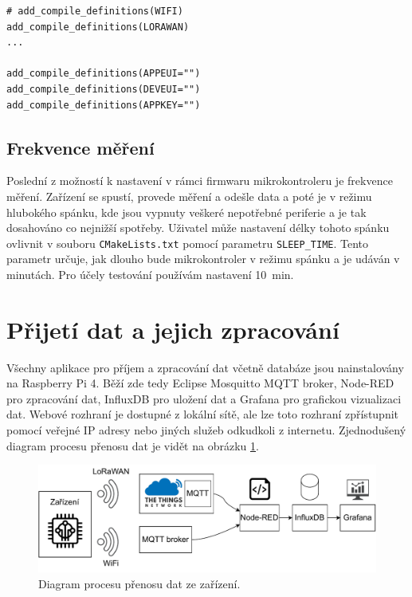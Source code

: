 \begin{lstlisting}[caption={Nastavení spojení pomocí LoRaWAN}]
# add_compile_definitions(WIFI)
add_compile_definitions(LORAWAN)
...

add_compile_definitions(APPEUI="")
add_compile_definitions(DEVEUI="")
add_compile_definitions(APPKEY="")
\end{lstlisting}

\subsection{Frekvence měření}

Poslední z možností k nastavení v rámci firmwaru mikrokontroleru je frekvence měření. Zařízení se spustí, provede měření a odešle data a poté je v režimu hlubokého spánku, kde jsou vypnuty veškeré nepotřebné periferie a je tak dosahováno co nejnižší spotřeby. Uživatel může nastavení délky tohoto spánku ovlivnit v souboru \texttt{CMakeLists.txt} pomocí parametru \texttt{SLEEP_TIME}. Tento parametr určuje, jak dlouho bude mikrokontroler v režimu spánku a je udáván v minutách. Pro účely testování používám nastavení \SI{10}{\minute}.

\section{Přijetí dat a jejich zpracování}

Všechny aplikace pro příjem a zpracování dat včetně databáze jsou nainstalovány na Raspberry Pi 4. Běží zde tedy Eclipse Mosquitto MQTT broker, Node-RED pro zpracování dat, InfluxDB pro uložení dat a Grafana pro grafickou vizualizaci dat. Webové rozhraní je dostupné z lokální sítě, ale lze toto rozhraní zpřístupnit pomocí veřejné IP adresy nebo jiných služeb odkudkoli z internetu. Zjednodušený diagram procesu přenosu dat je vidět na obrázku \ref{fig_dataFlow}.

\begin{figure}[h]
    \centering
    \includegraphics[width=\textwidth]{obrazky/data_flow.pdf}
    \caption{Diagram procesu přenosu dat ze zařízení.}
    \label{fig_dataFlow}
\end{figure}

